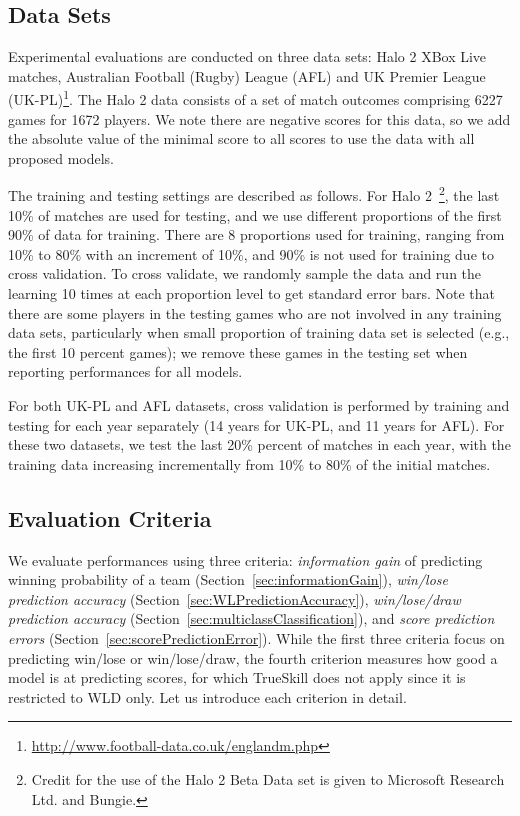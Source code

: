 \subsection{Data Sets}
\label{sec:data_sets}

Experimental evaluations are conducted on three data sets: Halo 2 XBox Live
matches, Australian Football
(Rugby) League (AFL)%
and UK
Premier League (UK-PL)\footnote{\noindent \url{http://www.football-data.co.uk/englandm.php}}.  The Halo 2 data consists of a
set of match outcomes comprising 6227 games for 1672 players. We note there are negative scores for this data, so we add the absolute value of the minimal score to all scores to use the data with all proposed models.

The training and testing settings are described as follows.  For Halo
2~\footnote{\noindent Credit for the use of the Halo 2 Beta Data set
is given to Microsoft Research Ltd. and Bungie.}, the last 10\%
of matches are used for testing, and we use different proportions of
the first 90\% of data for training. There are 8 proportions used
for training, ranging from 10\% to 80\% with an increment of
10\%, and 90\% is not used for training due to cross validation. To cross validate, we randomly sample the data and run the learning 10 times at each proportion level
to get standard error bars. Note that there are some players in the
testing games who are not involved in any training data sets,
particularly when small proportion of training data set is selected
(e.g., the first 10 percent games); we remove these games in the
testing set when reporting performances for all models.

For both UK-PL and AFL datasets, cross validation is performed by
training and testing for each year separately (14 years for UK-PL, and
11 years for AFL).  For these two datasets, we test the last 20\%
percent of matches in each year, with the training data increasing
incrementally from 10\% to 80\% of the initial matches.

\subsection{Evaluation Criteria}

We evaluate performances using three criteria: {\it information gain}
of predicting winning probability of a team
(Section~\ref{sec:informationGain}),
{\it win/lose prediction accuracy}
(Section~\ref{sec:WLPredictionAccuracy}), {\it win/lose/draw prediction accuracy} (Section~\ref{sec:multiclassClassification}), 
and {\it score prediction errors}
(Section~\ref{sec:scorePredictionError}).
While the first three criteria focus on predicting win/lose or win/lose/draw, the fourth
criterion measures how good a model is at predicting scores, for which
TrueSkill does not apply since it is restricted to WLD only. Let us
introduce each criterion in detail.


